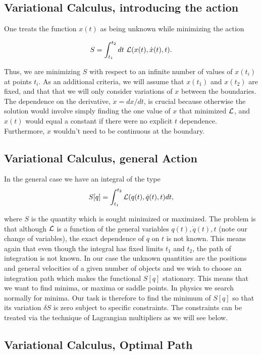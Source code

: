 \documentclass[%
oneside,                 %
final,                   %
10pt]{article}
\begin{document}
\subsection{Variational Calculus, introducing the action}

One treats the function $x(t)$ as being unknown while minimizing the action

\[
S=\int_{t_1}^{t_2}dt~{\cal L}(x(t),\dot{x}(t),t).
\]

Thus, we are minimizing $S$ with respect to an infinite number of
values of $x(t_i)$ at points $t_i$. As an additional criteria, we will
assume that $x(t_1)$ and $x(t_2)$ are fixed, and that that we will
only consider variations of $x$ between the boundaries. The dependence
on the derivative, $\dot{x}=dx/dt$, is crucial because otherwise the
solution would involve simply finding the one value of $x$ that
minimized ${\cal L}$, and $x(t)$ would equal a constant if there were no
explicit $t$ dependence. Furthermore, $x$ wouldn't need to be
continuous at the boundary.

\subsection{Variational Calculus, general Action}

In the general case we have an integral of the type
\[ 
S[q]= \int_{t_1}^{t_2} {\cal L}(q(t),\dot{q}(t),t)dt,
\]

where $S$ is the quantity which is sought minimized or maximized.  The
problem is that although ${\cal L}$  is a function of the general variables
$q(t),\dot{q}(t),t$ (note our change of variables), the exact dependence of $q$ on $t$ is not known.
This means again that even though the integral has fixed limits $t_1$
and $t_2$, the path of integration is not known. In our case the unknown
quantities are the positions and general velocities of a given number
of objects and we wish to choose an integration path which makes the
functional $S[q]$ stationary. This means that we want to find minima,
or maxima or saddle points. In physics we search normally for minima.
Our task is therefore to find the minimum of $S[q]$ so that its
variation $\delta S$ is zero subject to specific constraints.  The
constraints can be treated via the technique of Lagrangian multipliers
as we will see below.

\subsection{Variational Calculus, Optimal Path}
\end{document}

